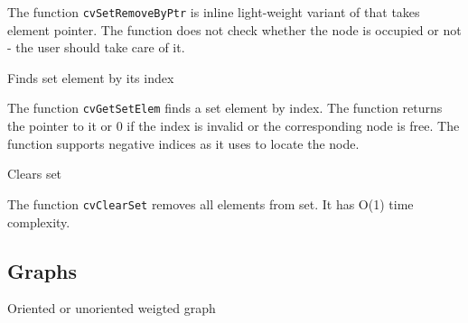 The function \texttt{cvSetRemoveByPtr} is inline light-weight variant of  that takes element pointer. The function does not check whether the node is occupied or not - the user should take care of it.


\label{GetSetElem}

Finds set element by its index


\begin{description}
\end{description}

The function \texttt{cvGetSetElem} finds a set element by index. The function returns the pointer to it or 0 if the index is invalid or the corresponding node is free. The function supports negative indices as it uses  to locate the node.

\label{ClearSet}

Clears set


\begin{description}
\end{description}


The function \texttt{cvClearSet} removes all elements from set. It has O(1) time complexity.


\subsection{Graphs}


\label{CvGraph}

Oriented or unoriented weigted graph

